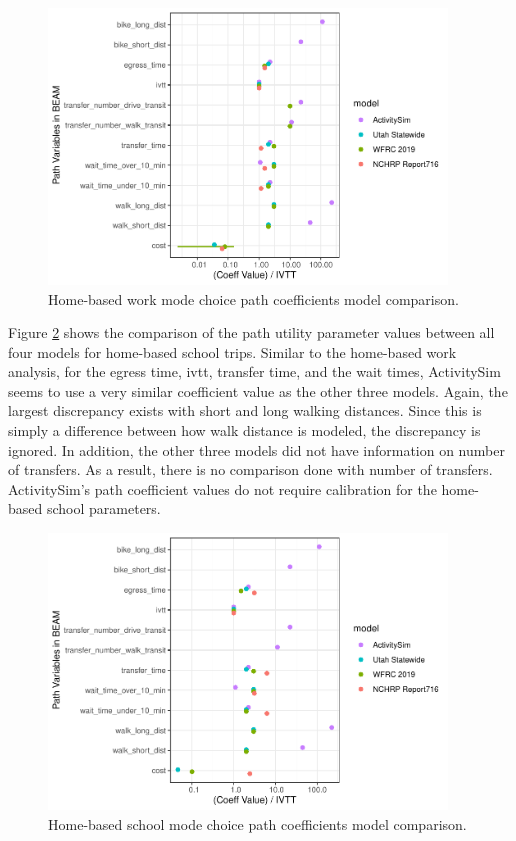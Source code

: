 \documentclass[12pt, oneside, openright]{byuthesis}
\begin{document}
\begin{figure}

{\centering \includegraphics[width=400px]{thesis_files/figure-latex/hbw-1} 

}

\caption{Home-based work mode choice path coefficients model comparison.}\label{fig:hbw}
\end{figure}

Figure \ref{fig:hbs} shows the comparison of the path utility parameter values between all four models for home-based school trips. Similar to the home-based work analysis, for the egress time, ivtt, transfer time, and the wait times, ActivitySim seems to use a very similar coefficient value as the other three models. Again, the largest discrepancy exists with short and long walking distances. Since this is simply a difference between how walk distance is modeled, the discrepancy is ignored. In addition, the other three models did not have information on number of transfers. As a result, there is no comparison done with number of transfers. ActivitySim's path coefficient values do not require calibration for the home-based school parameters.

\begin{figure}

{\centering \includegraphics[width=400px]{thesis_files/figure-latex/hbs-1} 

}

\caption{Home-based school mode choice path coefficients model comparison.}\label{fig:hbs}
\end{figure}
\end{document}
